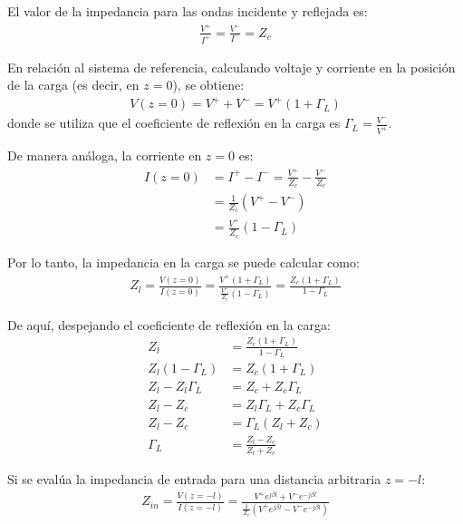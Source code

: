 \documentclass[
  11pt,
  letterpaper,
   addpoints,
   answers
  ]{exam}
\begin{document}
\begin{questions}
\begin{solution}
\begin{enumerate}
El valor de la impedancia para las ondas incidente y reflejada es:
\begin{align}
    \frac{V^{+}}{I^{+}} = \frac{V^{-}}{I^{-}} = Z_{c}
\end{align}

En relación al sistema de referencia, calculando voltaje y corriente en la posición de la carga (es decir, en $z=0$), se obtiene:
\begin{align}
    V(z=0) = V^{+} + V^{-} = V^{+}(1+\Gamma_{L})
\end{align}
donde se utiliza que el coeficiente de reflexión en la carga es $\Gamma_{L} = \frac{V^{-}}{V^{+}}$.

De manera análoga, la corriente en $z=0$ es:
\begin{align}
    I(z=0) &= I^{+} - I^{-} = \frac{V^{+}}{Z_{c}} - \frac{V^{-}}{Z_{c}} \\
           &= \frac{1}{Z_{c}} (V^{+} - V^{-}) \\
           &= \frac{V^{+}}{Z_{c}} (1 - \Gamma_{L})
\end{align}

Por lo tanto, la impedancia en la carga se puede calcular como:
\begin{align}
    Z_{l} = \frac{V(z=0)}{I(z=0)} = \frac{V^{+}(1+\Gamma_{L})}{\frac{V^{+}}{Z_{c}} (1-\Gamma_{L})} = \frac{Z_{c}(1+\Gamma_{L})}{1-\Gamma_{L}}
\end{align}

De aquí, despejando el coeficiente de reflexión en la carga:
\begin{align}
    Z_{l} &= \frac{Z_{c}(1+\Gamma_{L})}{1-\Gamma_{L}} \\
    Z_{l}(1-\Gamma_{L}) &= Z_{c}(1+\Gamma_{L}) \\
    Z_{l} - Z_{l}\Gamma_{L} &= Z_{c} + Z_{c}\Gamma_{L} \\
    Z_{l} - Z_{c} &= Z_{l}\Gamma_{L} + Z_{c}\Gamma_{L} \\
    Z_{l} - Z_{c} &= \Gamma_{L}(Z_{l} + Z_{c}) \\
    \Gamma_{L} &= \frac{Z_{l} - Z_{c}}{Z_{l} + Z_{c}}
\end{align}

Si se evalúa la impedancia de entrada para una distancia arbitraria $z = -l$:
\begin{align}
    Z_{in} = \frac{V(z=-l)}{I(z=-l)} = \frac{V^{+}e^{j\beta l} + V^{-}e^{-j\beta l}}{\frac{1}{Z_{c}} \left( V^{+}e^{j\beta l} - V^{-}e^{-j\beta l} \right)}
\end{align}


\end{enumerate}
\end{solution}
\end{questions}
\end{document}
